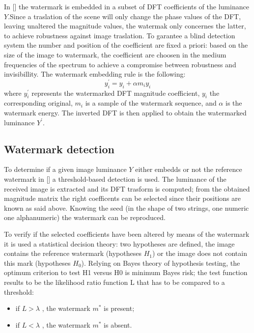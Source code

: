 In [] the watermark is embedded in a subset of DFT coefficients of the luminance $Y$.\newline Since a traslation of the scene will only change the phase values of the DFT, leaving unaltered the magnitude values, the watermak only concernes the latter, to achieve robustness against image traslation.\newline
To garantee a blind detection system the number and position of the coefficient are fixed a priori: based on the size of the image to watermark, the coefficient are choosen in the medium frequencies of the spectrum to achieve a compromise between robustness and invisibillity.\newline 
The watermark embedding rule is the following:
$$y_{i}^{'} = y_{i}+\alpha m_{i}y_{i} $$
where $y_{i}^{'}$ represents the watermarked DFT magnitude coefficient, $y_{i}$ the corresponding original, $m_{i}$ is a sample of the watermark sequence, and $\alpha$ is the watermark energy.\newline
The inverted DFT is then applied to obtain the watermarked luminance $Y^{'}$.

\subsection{Watermark detection}

To determine if a given image luminance $Y$ either embedds or not the reference watermark in [] a threshold-based detection is used.\newline
The luminance of the received image is extracted and its DFT trasform is computed; from the obtained magnitude matrix the right coefficents can be selected since their positions are known as said above.\newline
Knowing the seed (in the shape of two strings, one numeric one alphanumeric) the watermark can be reproduced.\newline

To verify if the selected coefficients have been altered by means of the watermark it is used a statistical decision theory: two hypotheses are defined, the image contains the reference watermark (hypotheses $H_{1}$) or the image does not contain this mark (hypotheses $H_{0}$). Relying on Bayes theory of hypothesis testing, the optimum criterion to test H1 versus H0 is minimum Bayes risk; the test function results to be the likelihood ratio function L that has to be compared to a threshold:\newline
\begin{itemize}
\item if $L > \lambda$ ,  the watermark $m^{*}$ is present;
\item if $L < \lambda$ , the watermark  $m^{*}$ is absent.
\end{itemize}


